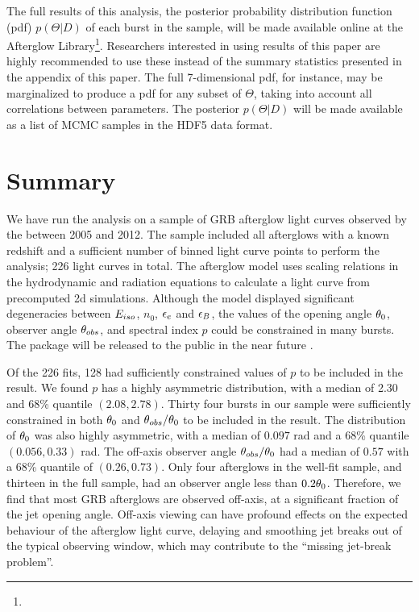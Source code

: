 The full results of this analysis, the posterior probability distribution function (pdf) $p(\Theta | D)$ of each burst in the sample, will be made available online at the Afterglow Library\footnote{\afterglowlibrary}. Researchers interested in using results of this paper are highly recommended to use these instead of the summary statistics presented in the appendix of this paper.  The full 7-dimensional pdf, for instance, may be marginalized to produce a pdf for any subset of $\Theta$, taking into account all correlations between parameters.  The posterior $p(\Theta | D)$ will be made available as a list of MCMC samples in the HDF5 data format.



\section{Summary}

We have run the \scalefit{} analysis on a sample of GRB afterglow light curves observed by the \swiftXRT{} between 2005 and 2012.  The sample included all afterglows with a known redshift and a sufficient number of binned light curve points to perform the analysis; 226 light curves in total.  The \scalefit{} afterglow model uses scaling relations in the hydrodynamic and radiation equations to calculate a light curve from precomputed 2d simulations.  Although the model displayed significant degeneracies between $E_{iso}$, $n_0$, $\epsilon_e$ and $\epsilon_B$, the values of the opening angle $\theta_0$, observer angle $\theta_{obs}$, and spectral index $p$ could be constrained in many bursts.  The \scalefit{} package will be released to the public in the near future \citep[][in prep]{vanEer14scalefit}.

Of the 226 fits, 128 had sufficiently constrained values of $p$ to be included in the result.  We found $p$ has a highly asymmetric distribution, with a median of 2.30 and 68\% quantile $( 2.08 , 2.78)$.  Thirty four bursts in our sample were sufficiently constrained in both $\theta_0$ and $\theta_{obs} / \theta_0$ to be included in the result.  The distribution of $\theta_0$ was also highly asymmetric, with a median of $0.097$ rad and a 68\% quantile $(0.056, 0.33)$ rad.  The off-axis observer angle $\theta_{obs}/\theta_0$ had a median of $0.57$ with a 68\% quantile of $(0.26, 0.73)$.  Only four afterglows in the well-fit sample, and thirteen in the full sample, had an observer angle less than $0.2 \theta_0$.  Therefore, we find that most GRB afterglows are observed off-axis, at a significant fraction of the jet opening angle.  Off-axis viewing can have profound effects on the expected behaviour of the afterglow light curve, delaying and smoothing jet breaks out of the typical \swift{} observing window, which may contribute to the ``missing jet-break problem''.

